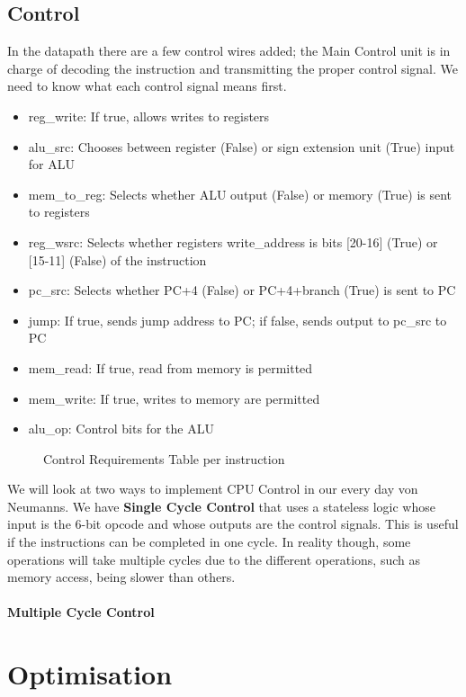 \subsection{Control}
In the datapath there are a few control wires added; the Main Control unit is in charge of decoding the instruction and transmitting the proper control signal. We need to know what each control signal means first.
\begin{itemize}
	\item reg\_write: If true, allows writes to registers
	\item alu\_src: Chooses between register (False) or sign extension unit (True) input for ALU
	\item mem\_to\_reg: Selects whether ALU output (False) or memory (True) is sent to registers
	\item reg\_wsrc: Selects whether registers write\_address is bits [20-16] (True) or [15-11] (False) of the instruction
	\item pc\_src: Selects whether PC+4 (False) or PC+4+branch (True) is sent to PC
	\item jump: If true, sends jump address to PC; if false, sends output to pc\_src to PC
	\item mem\_read: If true, read from memory is permitted
	\item mem\_write: If true, writes to memory are permitted
	\item alu\_op: Control bits for the ALU
\end{itemize}
\begin{figure}[!htb]
	\caption{\label{fig:control} Control Requirements Table per instruction}
\end{figure}
We will look at two ways to implement CPU Control in our every day von Neumanns. We have \textbf{Single Cycle Control} that uses a stateless logic whose input is the 6-bit opcode and whose outputs are the control signals. This is useful if the instructions can be completed in one cycle. In reality though, some operations will take multiple cycles due to the different operations, such as memory access, being slower than others.
\paragraph{Multiple Cycle Control}

\section{Optimisation}
